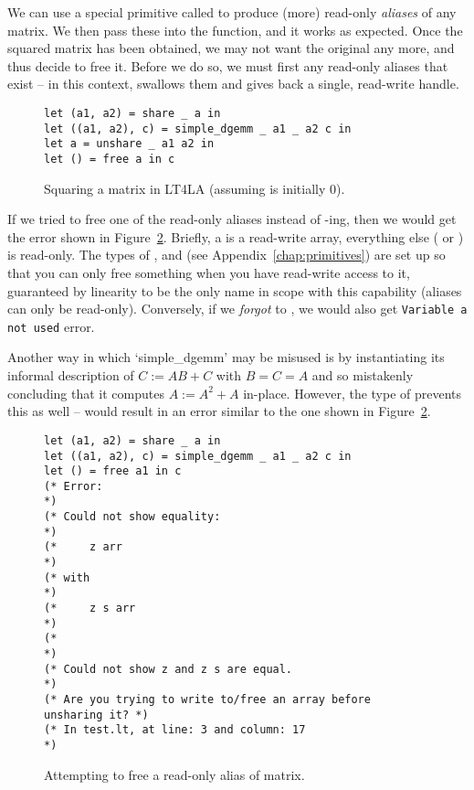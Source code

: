 We can use a special primitive called  to produce (more) read-only
\emph{aliases} of any matrix. We then pass these into the function, and it
works as expected. Once the squared matrix has been obtained, we may not want
the original any more, and thus decide to free it. Before we do so, we must
first  any read-only aliases that exist -- in this context,
 swallows them and gives back a single, read-write handle.

\begin{figure}[tp]
    \begin{verbatim}
let (a1, a2) = share _ a in
let ((a1, a2), c) = simple_dgemm _ a1 _ a2 c in
let a = unshare _ a1 a2 in
let () = free a in c
    \end{verbatim}
    \caption{Squaring a matrix in LT4LA (assuming  is initially
        0).}\label{fig:ltfla_square}
\end{figure}

If we tried to free one of the read-only aliases instead of
-ing, then we would get the error shown in
Figure~\ref{fig:ltfla_free}. Briefly, a  is a read-write array,
everything else ( or ) is read-only. The types of
,  and  (see
Appendix~\ref{chap:primitives}) are set up so that you can only free something
when you have read-write access to it, guaranteed by linearity to be the only
name in scope with this capability (aliases can only be read-only). Conversely,
if we \emph{forgot} to , we would also get \texttt{Variable a not
used} error.

Another way in which `simple\_dgemm' may be misused is by instantiating its
informal description of $C := AB + C$ with $B = C = A$ and so mistakenly
concluding that it computes $A := A^2 + A$ in-place. However, the type of
 prevents this as well --  would result in an error similar to the one shown
in Figure~\ref{fig:ltfla_free}.

\begin{figure}[tp]
    \begin{verbatim}
let (a1, a2) = share _ a in
let ((a1, a2), c) = simple_dgemm _ a1 _ a2 c in
let () = free a1 in c
(* Error:                                                        *)
(* Could not show equality:                                      *)
(*     z arr                                                     *)
(* with                                                          *)
(*     z s arr                                                   *)
(*                                                               *)
(* Could not show z and z s are equal.                           *)
(* Are you trying to write to/free an array before unsharing it? *)
(* In test.lt, at line: 3 and column: 17                         *)
    \end{verbatim}
    \caption{Attempting to free a read-only alias of matrix.}\label{fig:ltfla_free}
\end{figure}


